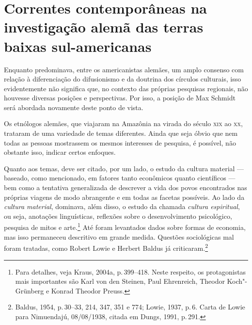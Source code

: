 \section{Correntes contemporâneas na investigação alemã das terras baixas sul-americanas}

Enquanto predominava, entre os americanistas alemães, um amplo consenso
com relação à diferenciação do difusionismo e da doutrina dos círculos
culturais, isso evidentemente não significa que, no contexto das
próprias pesquisas regionais, não houvesse diversas posições e
perspectivas. Por isso, a posição de Max Schmidt será abordada
novamente deste ponto de vista.

Os etnólogos alemães, que viajaram na Amazônia na virada do século \textsc{xix}
ao \textsc{xx}, trataram de uma variedade de temas diferentes. Ainda que seja
óbvio que nem todas as pessoas mostrassem os mesmos interesses de
pesquisa, é possível, não obstante isso, indicar certos enfoques.

Quanto aos temas, deve ser citado, por um lado, o estudo da cultura
material --- baseado, como mencionado, em fatores tanto econômicos quanto
científicos --- bem como a tentativa generalizada de descrever a vida dos
povos encontrados nas próprias viagens de modo abrangente e em todas as
facetas possíveis. Ao lado da \textit{cultura material}, dominava, além
disso, o estudo da chamada \textit{cultura espiritual}, ou seja, anotações linguísticas, reflexões sobre o
desenvolvimento psicológico, pesquisa de mitos e arte.\footnote{Para
  detalhes, veja Kraus, 2004a, p.\,399--418. Neste respeito, os
  protagonistas mais importantes são Karl von den Steinen, Paul
  Ehrenreich, Theodor Koch"-Grünberg e Konrad Theodor Preuss.} Até foram
levantados dados sobre formas de economia, mas isso permaneceu
descritivo em grande medida. Questões sociológicas mal foram tratadas,
como Robert Lowie e Herbert Baldus já criticaram.\footnote{Baldus, 1954,
  p.\,30--33, 214, 347, 351 e 774; Lowie, 1937, p.\,6. Carta de Lowie para
  Nimuendajú, 08/08/1938, citada em Dungs, 1991, p.\,291.}

